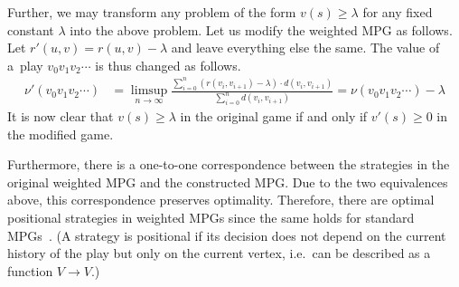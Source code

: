 Further, we may transform any problem of the form $v(s) \ge \lambda$ for any fixed
constant $\lambda$ into the above problem. Let us modify the weighted MPG as
follows. Let $r'(u,v) = r(u,v) - \lambda$ and leave everything else the same.
The value of a~play $v_0v_1v_2\cdots$ is thus changed as follows.
\begin{align*}
\nu'(v_0v_1v_2\cdots) &= \limsup_{n\to\infty} \frac{\sum_{i = 0}^{n} 
        (r(v_i,v_{i+1}) - \lambda) \cdot d(v_i,v_{i+1})}
       {\sum_{i = 0}^{n} d(v_i,v_{i+1})} = \nu(v_0v_1v_2\cdots) - \lambda
\end{align*}
It is now clear that $v(s) \ge \lambda$ in the original game if and only if $v'(s) \ge 0$ in the modified game. 

Furthermore, there is a one-to-one correspondence between the strategies in the original weighted MPG and the constructed MPG. Due to the two equivalences above, this correspondence preserves optimality. Therefore, there are optimal positional strategies in weighted MPGs since the same holds for standard MPGs~\cite{em79mpg}. (A strategy is positional if its decision does not depend on the current history of the play but only on the current vertex, i.e.~can be described as a function $V\to V$.)




